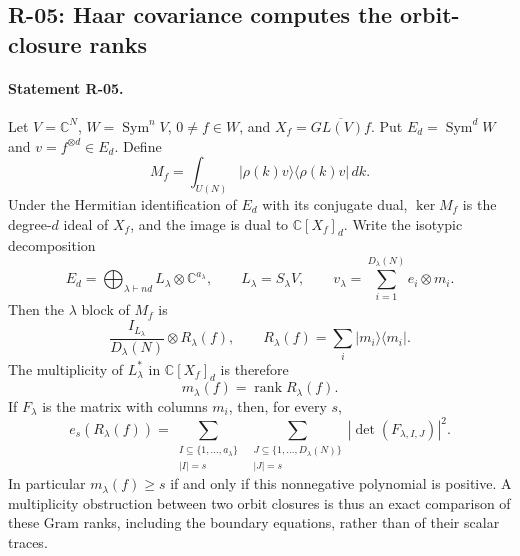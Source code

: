 \subsection{R-05: Haar covariance computes the orbit-closure ranks}

\paragraph{Statement R-05.}
Let $V=\mathbb C^N$, $W=\operatorname{Sym}^nV$, $0\ne f\in W$, and
$X_f=\overline{GL(V)f}$. Put $E_d=\operatorname{Sym}^dW$ and
$v=f^{\otimes d}\in E_d$. Define
\begin{equation}\label{R05:twirl}
 M_f=\int_{U(N)}|\rho(k)v\rangle\langle\rho(k)v|\,dk.
\end{equation}
Under the Hermitian identification of $E_d$ with its conjugate dual,
$\ker M_f$ is the degree-$d$ ideal of $X_f$, and the image is dual to
$\mathbb C[X_f]_d$. Write the isotypic decomposition
\[
 E_d=\bigoplus_{\lambda\vdash nd} L_\lambda\otimes\mathbb C^{a_\lambda},
 \qquad L_\lambda=S_\lambda V,
 \qquad v_\lambda=\sum_{i=1}^{D_\lambda(N)}e_i\otimes m_i.
\]
Then the $\lambda$ block of $M_f$ is
\begin{equation}\label{R05:block}
 \frac{I_{L_\lambda}}{D_\lambda(N)}\otimes R_\lambda(f),
 \qquad R_\lambda(f)=\sum_i|m_i\rangle\langle m_i|.
\end{equation}
The multiplicity of $L_\lambda^*$ in $\mathbb C[X_f]_d$ is therefore
\begin{equation}\label{R05:rank}
 m_\lambda(f)=\operatorname{rank}R_\lambda(f).
\end{equation}
If $F_\lambda$ is the matrix with columns $m_i$, then, for every $s$,
\begin{equation}\label{R05:minors}
 e_s(R_\lambda(f))=
 \sum_{\substack{I\subseteq\{1,\ldots,a_\lambda\}\\|I|=s}}
 \ \sum_{\substack{J\subseteq\{1,\ldots,D_\lambda(N)\}\\|J|=s}}
       |\det(F_{\lambda,I,J})|^2.
\end{equation}
In particular $m_\lambda(f)\geq s$ if and only if this nonnegative
polynomial is positive. A multiplicity obstruction between two orbit
closures is thus an exact comparison of these Gram ranks, including
the boundary equations, rather than of their scalar traces.

